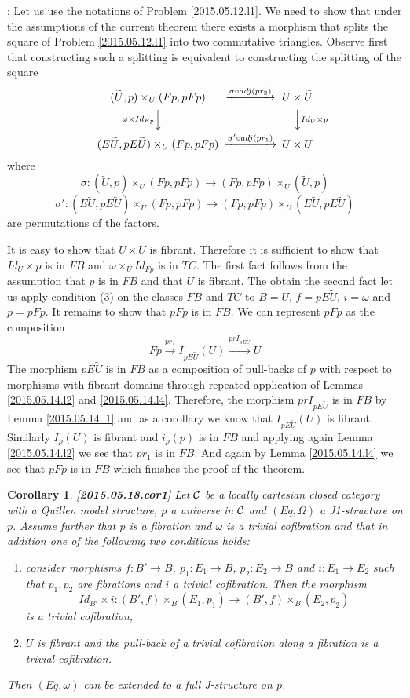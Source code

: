 \documentclass[12pt]{article}
\newenvironment{myproof}{{\bf Proof}:}{\vskip 5mm }
\newtheorem{cor}[proposition]{Corollary}
\newcommand{\llabel}[1]{\label{#1}[{\bf #1}]}
\newcommand{\sr}{\rightarrow}
\newcommand{\wt}{\widetilde}
\begin{document}
\begin{myproof}
Let us use the notations of Problem \ref{2015.05.12.l1}. We need to show that under the assumptions of the current theorem there exists a morphism that splits the square of Problem \ref{2015.05.12.l1} into two commutative triangles. Observe first that constructing such a splitting is equivalent to constructing the splitting of the square
%
$$
\begin{CD}
(\wt{U},p)\times_U (Fp,pFp) @>\sigma\circ adj(pr_2)>> U\times\wt{U}\\
@V\omega \times Id_{Fp} VV @VV Id_U\times p V\\
(E\wt{U},pE\wt{U})\times_U (Fp,pFp) @>\sigma'\circ adj(pr_1)>> U\times U
\end{CD}
$$
%
where
%
$$\sigma:(\wt{U},p)\times_U (Fp,pFp)\sr (Fp,pFp)\times_U  (\wt{U},p)$$
$$\sigma':(E\wt{U},pE\wt{U})\times_U (Fp,pFp) \sr  (Fp,pFp)  \times_U  (E\wt{U},pE\wt{U})$$
%
are permutations of the factors. 

It is easy to show that $U\times U$ is fibrant. Therefore it is sufficient to show that $Id_U\times p$ is in $FB$ and $\omega\times_U Id_{Fp}$ is in $TC$. The first fact follows from the assumption that $p$ is in $FB$ and that $U$ is fibrant. The obtain the second fact let us apply condition (3) on the classes $FB$ and $TC$ to $B=U$, $f=pE\wt{U}$, $i=\omega$ and $p=pFp$.  It remains to show that $pFp$ is in $FB$. We can represent $pFp$ as the composition
%
$$Fp\stackrel{pr_1}{\sr} I_{pE\wt{U}}(U) \stackrel{prI_{pE\wt{U}}}{\sr} U$$
%
The morphism $pE\wt{U}$ is in $FB$ as a composition of pull-backs of $p$ with respect to morphisms with fibrant domains through repeated application of Lemmas \ref{2015.05.14.l2} and \ref{2015.05.14.l4}. Therefore, the morphism $prI_{pE\wt{U}}$ is in $FB$ by Lemma \ref{2015.05.14.l1} and as a corollary we know that $I_{pE\wt{U}}(U)$ is fibrant. Similarly $I_p(U)$ is fibrant and $i_p(p)$ is in $FB$ and applying again Lemma \ref{2015.05.14.l2} we see that $pr_1$ is in $FB$. And again by Lemma \ref{2015.05.14.l4} we see that $pFp$ is in $FB$ which finishes the proof of the theorem.  
\end{myproof}
%
\begin{cor}
\llabel{2015.05.18.cor1}
Let $\cal C$ be a locally cartesian closed category with a Quillen model structure, $p$ a universe in $\cal C$ and $(Eq,\Omega)$ a J1-structure on $p$. Assume further that $p$ is a fibration and $\omega$ is a trivial cofibration and that in addition one of the following two conditions holds:
%
\begin{enumerate}
\item consider morphisms $f: B'\sr B$, $p_1:E_1\sr B$, $p_2:E_2\sr B$ and $i:E_1\sr E_2$ such that $p_1,p_2$ are fibrations and $i$ a trivial cofibration. Then the morphism
%
$$Id_{B'}\times i: (B',f)\times_B(E_1,p_1)\sr (B',f)\times_B(E_2,p_2)$$
%
is a trivial cofibration,
%
\item $U$ is fibrant and the pull-back of a trivial cofibration along a fibration is a trivial cofibration.
\end{enumerate}
%
Then $(Eq,\omega)$ can be extended to a full J-structure on $p$. 
\end{cor}
%
\end{document}
